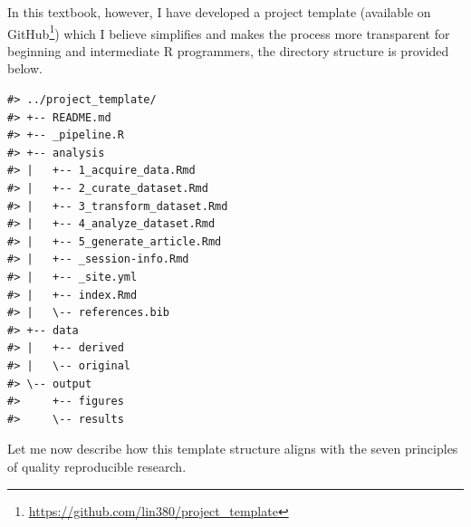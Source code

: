 \documentclass[
  letterpaper,
]{latex/krantz}
\DeclareRobustCommand{\href}[2]{#2\footnote{\url{#1}}}
\begin{document}
In this textbook, however, I have developed a project template
(\href{https://github.com/lin380/project_template}{available on GitHub})
which I believe simplifies and makes the process more transparent for
beginning and intermediate R programmers, the directory structure is
provided below.

\begin{verbatim}
#> ../project_template/
#> +-- README.md
#> +-- _pipeline.R
#> +-- analysis
#> |   +-- 1_acquire_data.Rmd
#> |   +-- 2_curate_dataset.Rmd
#> |   +-- 3_transform_dataset.Rmd
#> |   +-- 4_analyze_dataset.Rmd
#> |   +-- 5_generate_article.Rmd
#> |   +-- _session-info.Rmd
#> |   +-- _site.yml
#> |   +-- index.Rmd
#> |   \-- references.bib
#> +-- data
#> |   +-- derived
#> |   \-- original
#> \-- output
#>     +-- figures
#>     \-- results
\end{verbatim}

Let me now describe how this template structure aligns with the seven
principles of quality reproducible research.
\end{document}
